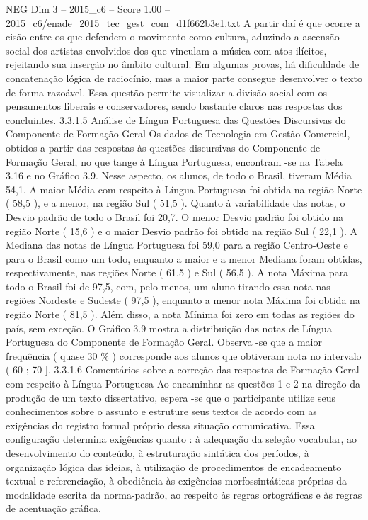 \begin{textsample}{NEG Dim 3 – 2015\_c6 – Score 1.00 – 2015\_c6/enade\_2015\_tec\_gest\_com\_d1f662b3e1.txt}
A partir daí é que ocorre a cisão entre os que defendem o movimento como cultura, aduzindo a ascensão social dos artistas envolvidos dos que vinculam a música com atos ilícitos, rejeitando sua inserção no âmbito cultural.
Em algumas provas, há dificuldade de concatenação lógica de raciocínio, mas a maior parte consegue desenvolver o texto de forma razoável.
Essa questão permite visualizar a divisão social com os pensamentos liberais e conservadores, sendo bastante claros nas respostas dos concluintes. 3.3.1.5 Análise de Língua Portuguesa das Questões Discursivas do Componente de Formação Geral Os dados de Tecnologia em Gestão Comercial, obtidos a partir das respostas às questões discursivas do Componente de Formação Geral, no que tange à Língua Portuguesa, encontram -se na Tabela 3.16 e no Gráfico 3.9.
Nesse aspecto, os alunos, de todo o Brasil, tiveram Média 54,1.
A maior Média com respeito à Língua Portuguesa foi obtida na região Norte ( 58,5 ), e a menor, na região Sul ( 51,5 ).
Quanto à variabilidade das notas, o Desvio padrão de todo o Brasil foi 20,7.
O menor Desvio padrão foi obtido na região Norte ( 15,6 ) e o maior Desvio padrão foi obtido na região Sul ( 22,1 ).
A Mediana das notas de Língua Portuguesa foi 59,0 para a região Centro-Oeste e para o Brasil como um todo, enquanto a maior e a menor Mediana foram obtidas, respectivamente, nas regiões Norte ( 61,5 ) e Sul ( 56,5 ).
A nota Máxima para todo o Brasil foi de 97,5, com, pelo menos, um aluno tirando essa nota nas regiões Nordeste e Sudeste ( 97,5 ), enquanto a menor nota Máxima foi obtida na região Norte ( 81,5 ).
Além disso, a nota Mínima foi zero em todas as regiões do país, sem exceção.
O Gráfico 3.9 mostra a distribuição das notas de Língua Portuguesa do Componente de Formação Geral.
Observa -se que a maior frequência ( quase 30 \% ) corresponde aos alunos que obtiveram nota no intervalo ( 60 ; 70 ]. 3.3.1.6 Comentários sobre a correção das respostas de Formação Geral com respeito à Língua Portuguesa Ao encaminhar as questões 1 e 2 na direção da produção de um texto dissertativo, espera -se que o participante utilize seus conhecimentos sobre o assunto e estruture seus textos de acordo com as exigências do registro formal próprio dessa situação comunicativa.
Essa configuração determina exigências quanto : à adequação da seleção vocabular, ao desenvolvimento do conteúdo, à estruturação sintática dos períodos, à organização lógica das ideias, à utilização de procedimentos de encadeamento textual e referenciação, à obediência às exigências morfossintáticas próprias da modalidade escrita da norma-padrão, ao respeito às regras ortográficas e às regras de acentuação gráfica.

\end{textsample}
